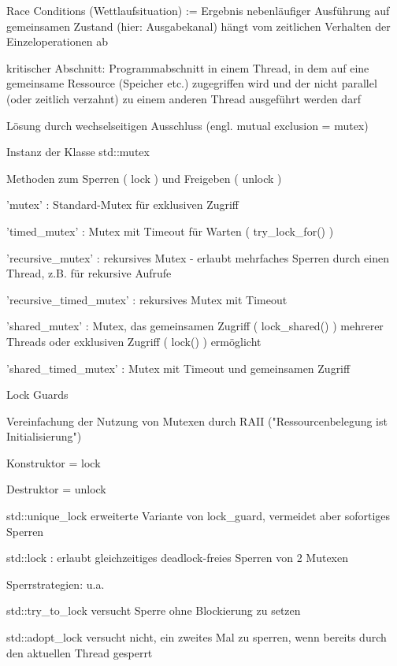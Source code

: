 \documentclass[10pt]{article}
\begin{document}
  
  \begin{itemize*}
    \item Race Conditions (Wettlaufsituation) := Ergebnis nebenläufiger Ausführung auf gemeinsamen Zustand (hier: Ausgabekanal) hängt vom zeitlichen Verhalten der Einzeloperationen ab
    \item kritischer Abschnitt: Programmabschnitt in einem Thread, in dem auf eine gemeinsame Ressource (Speicher etc.) zugegriffen wird und der nicht parallel (oder zeitlich verzahnt) zu einem anderen Thread ausgeführt werden darf
    \item Lösung durch wechselseitigen Ausschluss (engl. mutual exclusion = mutex)
    \begin{itemize*}
      \item Instanz der Klasse std::mutex
      \item Methoden zum Sperren ( lock ) und Freigeben ( unlock )
      \item 'mutex' : Standard-Mutex für exklusiven Zugriff
      \item 'timed\_mutex' : Mutex mit Timeout für Warten ( try\_lock\_for() )
      \item 'recursive\_mutex' : rekursives Mutex - erlaubt mehrfaches Sperren durch einen Thread, z.B. für rekursive Aufrufe
      \item 'recursive\_timed\_mutex' : rekursives Mutex mit Timeout
      \item 'shared\_mutex' : Mutex, das gemeinsamen Zugriff ( lock\_shared() ) mehrerer Threads oder exklusiven Zugriff ( lock() ) ermöglicht
      \item 'shared\_timed\_mutex' : Mutex mit Timeout und gemeinsamen Zugriff
    \end{itemize*}
    \item Lock Guards
    \begin{itemize*}
      \item Vereinfachung der Nutzung von Mutexen durch RAII ("Ressourcenbelegung ist Initialisierung")
      \item Konstruktor = lock
      \item Destruktor = unlock
      \item std::unique\_lock erweiterte Variante von lock\_guard, vermeidet aber sofortiges Sperren
      \item std::lock : erlaubt gleichzeitiges deadlock-freies Sperren von 2 Mutexen
      \item Sperrstrategien: u.a.
      \begin{itemize*}
        \item std::try\_to\_lock versucht Sperre ohne Blockierung zu setzen
        \item std::adopt\_lock versucht nicht, ein zweites Mal zu sperren, wenn bereits durch den aktuellen Thread gesperrt
      \end{itemize*}
    \end{itemize*}
  \end{itemize*}
  
\end{document}
